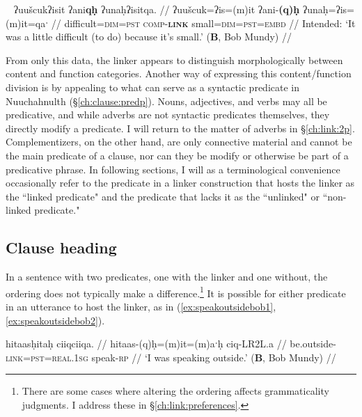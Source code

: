 \ex~ \label{ex:hardsmall2}
\begingl
\glpreamble *ʔuušcukʔisit ʔani\textbf{qḥ} ʔunaḥʔisitqa. //
\gla ʔuušcuk=ʔis=(m)it ʔani-\textbf{(q)ḥ} ʔunaḥ=ʔis=(m)it=qaˑ //
\glb difficult=\textsc{dim}=\textsc{pst} \textsc{comp}-\textbf{\textsc{link}} small=\textsc{dim}=\textsc{pst}=\textsc{embd} //
\glft Intended: `It was a little difficult (to do) because it's small.' (\textbf{B}, Bob Mundy) //
\endgl
\xe

From only this data, the linker appears to distinguish morphologically between content and function categories. Another way of expressing this content/function division is by appealing to what can serve as a syntactic predicate in Nuuchahnulth (\S\ref{ch:clause:predp}). Nouns, adjectives, and verbs may all be predicative, and while adverbs are not syntactic predicates themselves, they directly modify a predicate. I will return to the matter of adverbs in \S\ref{ch:link:2p}. Complementizers, on the other hand, are only connective material and cannot be the main predicate of a clause, nor can they be modify or otherwise be part of a predicative phrase. In following sections, I will as a terminological convenience occasionally refer to the predicate in a linker construction that hosts the linker as the ``linked predicate" and the predicate that lacks it as the ``unlinked" or ``non-linked predicate."


\subsection{Clause heading} \label{ch:link:clause}

In a sentence with two predicates, one with the linker and one without, the ordering does not typically make a difference.\footnote{There are some cases where altering the ordering affects grammaticality judgments. I address these in \S\ref{ch:link:preferences}.} It is possible for either predicate in an utterance to host the linker, as in (\ref{ex:speakoutsidebob1}, \ref{ex:speakoutsidebob2}).

\ex \label{ex:speakoutsidebob1}
\begingl
\glpreamble hitaasḥitaḥ ciiqciiqa. //
\gla hitaas-(q)ḥ=(m)it=(m)aˑḥ ciq-LR2L.a //
\glb be.outside-\textsc{link}=\textsc{pst}=\textsc{real.1sg} speak-\textsc{rp} //
\glft `I was speaking outside.' (\textbf{B}, Bob Mundy) //
\endgl
\xe

